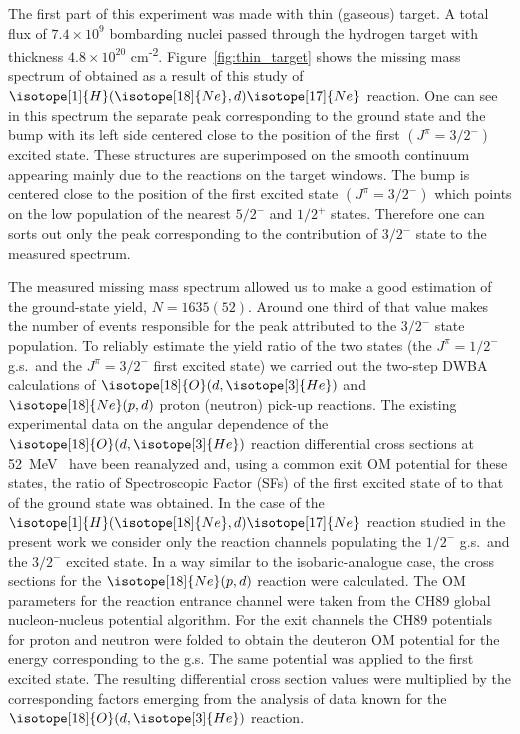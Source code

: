 \documentclass[superscriptaddress,showpacs,showkeys,twoside,floatfix,twocolumn]
{revtex4-1}
\begin{document}
The first part of this experiment was made with thin (gaseous) target.
A total flux of $7.4\times 10^9$ bombarding  nuclei
passed through the hydrogen target with thickness $4.8 \times 10^{20}$ cm\textsuperscript{-2}.
Figure~\ref{fig:thin_target} shows the missing mass spectrum of
 obtained as a result of this study of
\(\isotope[1]{H}(\isotope[18]{Ne},d)\isotope[17]{Ne}\) reaction.
One can see in this spectrum the separate peak corresponding to the  ground state
and the bump with its left side centered close to the position of the first
\((J^{\pi} = 3/2^-)\) excited state.
These structures are superimposed on the smooth continuum
appearing mainly due to the reactions on the target windows.
The bump is centered close to the position of the first excited state
\((J^\pi=3/2^-)\) which points on the low population
of the nearest \(5/2^-\) and \(1/2^+\) states.
Therefore one can  sorts out only the peak corresponding to
the contribution of \(3/2^-\) state to the measured spectrum.


The measured missing mass spectrum allowed us to make a good estimation of
the ground-state yield, \(N=1635(52)\).
Around one third of that value makes the number of events responsible for
the peak attributed to the \(3/2^-\) state population.
To reliably estimate the yield ratio of the two states
(the \(J^\pi=1/2^-\) g.s.\ and the \(J^\pi=3/2^-\) first excited state)
we carried out the two-step DWBA calculations of \(\isotope[18]{O}(d,\isotope[3]{He})\) and
\(\isotope[18]{Ne}(p,d)\) proton (neutron) pick-up reactions.
The existing experimental data on the angular dependence of
the \(\isotope[18]{O}(d,\isotope[3]{He})\) reaction differential cross sections
at 52~MeV~\cite{Hartwig:1971} have been reanalyzed and, using a common exit
 OM potential for these states, the ratio of
Spectroscopic Factor (SFs) of the first excited state of 
to that of the ground state was obtained.
In the case of the \(\isotope[1]{H}(\isotope[18]{Ne},d)\isotope[17]{Ne}\) reaction
studied in the present work we consider only the reaction channels
populating the \(1/2^-\) g.s.\ and the \(3/2^-\) excited state.
In a way similar to the isobaric-analogue case, the cross sections for the
\(\isotope[18]{Ne}(p,d)\) reaction were calculated.
The OM parameters for the reaction entrance channel were taken from
the CH89 global nucleon-nucleus potential algorithm.
For the exit channels the CH89 potentials for proton and neutron were folded
to obtain the deuteron OM potential for the energy corresponding to the
 g.s.
The same potential was applied to the  first excited state.
The resulting differential cross section values were multiplied by
the corresponding factors emerging from the analysis of data known for the
\(\isotope[18]{O}(d,\isotope[3]{He})\) reaction.
\end{document}
